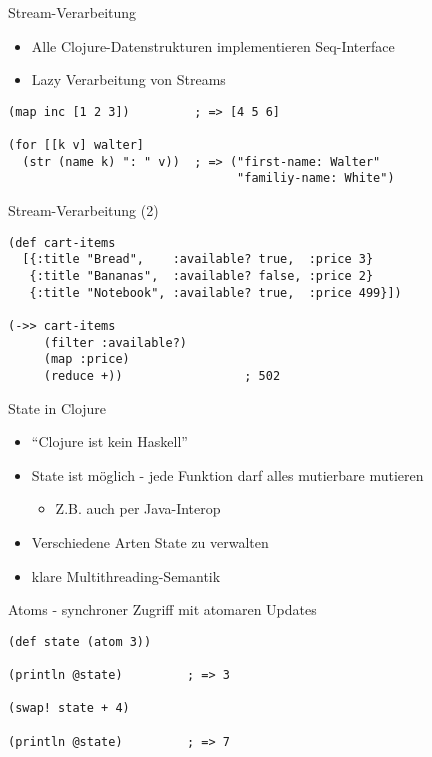 \documentclass[presentation]{beamer}
\begin{document}
\begin{frame}[fragile]{Stream-Verarbeitung}
  \begin{itemize}
  \item Alle Clojure-Datenstrukturen implementieren Seq-Interface
  \item Lazy Verarbeitung von Streams
  \end{itemize}
  \begin{block}{}
\begin{verbatim}
(map inc [1 2 3])         ; => [4 5 6]

(for [[k v] walter]
  (str (name k) ": " v))  ; => ("first-name: Walter"
                                "familiy-name: White")

\end{verbatim}
  \end{block}
\end{frame}

\begin{frame}[fragile]{Stream-Verarbeitung (2)}
  \begin{block}{}
\begin{verbatim}
(def cart-items
  [{:title "Bread",    :available? true,  :price 3}
   {:title "Bananas",  :available? false, :price 2}
   {:title "Notebook", :available? true,  :price 499}])

(->> cart-items
     (filter :available?)
     (map :price)
     (reduce +))                 ; 502

\end{verbatim}
  \end{block}
\end{frame}

\begin{frame}[fragile]{State in Clojure}
  \begin{itemize}
  \item ``Clojure ist kein Haskell''
  \item State ist möglich - jede Funktion darf alles mutierbare mutieren
    \begin{itemize}
    \item Z.B. auch per Java-Interop
    \end{itemize}
  \item Verschiedene Arten State zu verwalten
  \item klare Multithreading-Semantik
  \end{itemize}
  \begin{block}{Atoms - synchroner Zugriff mit atomaren Updates}
\begin{verbatim}
(def state (atom 3))

(println @state)         ; => 3

(swap! state + 4)

(println @state)         ; => 7
\end{verbatim}
  \end{block}
\end{frame}
\end{document}
